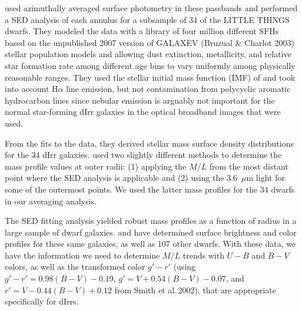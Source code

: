\documentclass[12pt]{emulateapj}
\begin{document}
\citet{z+12} used azimuthally averaged surface photometry in these passbands and performed a SED analysis of each annulus for a subsample of 34 of the LITTLE THINGS dwarfs.  They modeled the data with a library of four million different SFHs based on the unpublished 2007 version of GALAXEV (Bruzual \& Charlot 2003) stellar population models and allowing dust extinction, metallicity, and relative star formation rate among different age bins to vary uniformly among physically reasonable ranges. They used the stellar initial mass function (IMF) of \citet{c03} and took into account H$\alpha$ line emission, but not contamination from polycyclic aromatic hydrocarbon lines since nebular emission is arguably not important for the normal star-forming dIrr galaxies in the optical broadband images that were used. 

From the fits to the data, they derived stellar mass surface density distributions for the 34 dIrr galaxies. \citet{z+12} used two slightly different methods to determine the mass profile values at outer radii: (1) applying the $M/L$ from the most distant point where the SED analysis is applicable and (2) using the 3.6~$\mu$m light for some of the outermost points.  We used the latter mass profiles for the 34 dwarfs in our averaging analysis.

The SED fitting analysis yielded robust mass profiles as a function of radius in a large sample of dwarf galaxies. \citet{Paper1} and \citet{Paper2} have determined surface brightness and color profiles for these same galaxies, as well as 107 other dwarfs. With these data, we have the information we need to determine $M/L$ trends with $U-B$ and $B-V$ colors, as well as the transformed color $g'-r'$ (using $g'-r' = 0.98(B-V) - 0.19$, $g' = V + 0.54(B-V) - 0.07$, and $r' = V - 0.44(B-V) + 0.12$ from Smith et al.\,2002), that are appropriate specifically for dIrrs.
\end{document}
